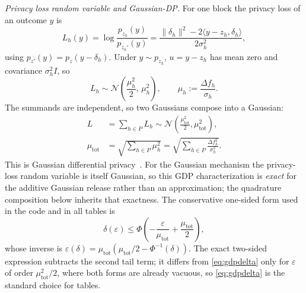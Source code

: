 \documentclass{ieeetj}
\theoremstyle{plain}
\theoremstyle{definition}
\begin{document}
\emph{Privacy loss random variable and Gaussian-DP.} For one block the privacy
loss of an outcome $y$ is
\begin{equation}
L_h(y)=\log\frac{p_{z_h}(y)}{p_{z_h'}(y)}
=\frac{\|\delta_h\|^{2}-2\langle y-z_h,\delta_h\rangle}{2\sigma_h^{2}},
\label{eq:loss}
\end{equation}
using $p_{z'}(y)=p_z(y-\delta_h)$. Under $y\sim p_{z_h}$,
$u=y-z_h$ has mean zero and covariance $\sigma_h^2I$, so
\begin{equation}
L_h\sim\mathcal{N}\!\left(\frac{\mu_h^{2}}{2},\,\mu_h^{2}\right),
\qquad \mu_h:=\frac{\Delta f_h}{\sigma_h}.
\label{eq:gdpblock}
\end{equation}
The summands are independent, so two Gaussians compose into a Gaussian:
\begin{equation}\begin{split}
L&=\sum_{h\in P}L_h
\sim\mathcal{N}\!\left(\frac{\mu_{\mathrm{tot}}^{2}}{2},
\mu_{\mathrm{tot}}^{2}\right),\\
\mu_{\mathrm{tot}}&=\sqrt{\sum_{h\in P}\mu_h^{2}}
=\sqrt{\sum_{h\in P}\frac{\Delta f_h^{2}}{\sigma_h^{2}}}.
\end{split}\label{eq:gdpsum}
\end{equation}
This is Gaussian differential privacy~\cite{dong2022gdp}. For the Gaussian
mechanism the privacy-loss random variable is itself Gaussian, so this GDP
characterization is \emph{exact} for the additive Gaussian release rather than
an approximation; the quadrature composition below inherits that exactness.
The conservative
one-sided form used in the code and in all tables is
\begin{equation}
\delta(\varepsilon)\le\Phi\!\left(-\frac{\varepsilon}{\mu_{\mathrm{tot}}}
+\frac{\mu_{\mathrm{tot}}}{2}\right),
\label{eq:gdpdelta}
\end{equation}
whose inverse is
$\varepsilon(\delta)=\mu_{\mathrm{tot}}(\mu_{\mathrm{tot}}/2-\Phi^{-1}(\delta))$.
The exact two-sided expression subtracts the second tail term; it differs
from \eqref{eq:gdpdelta} only for $\varepsilon$ of order
$\mu_{\mathrm{tot}}^2/2$, where both forms are already vacuous, so
\eqref{eq:gdpdelta} is the standard choice for tables.
\end{document}
